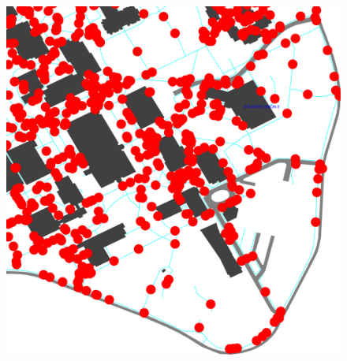 \documentclass[twoside,10pt]{book}
\begin{document}
\begin{figure}
\vspace{-1.1in}\includegraphics[height=11in]{campus.pdf}
\end{figure}
\end{document}
